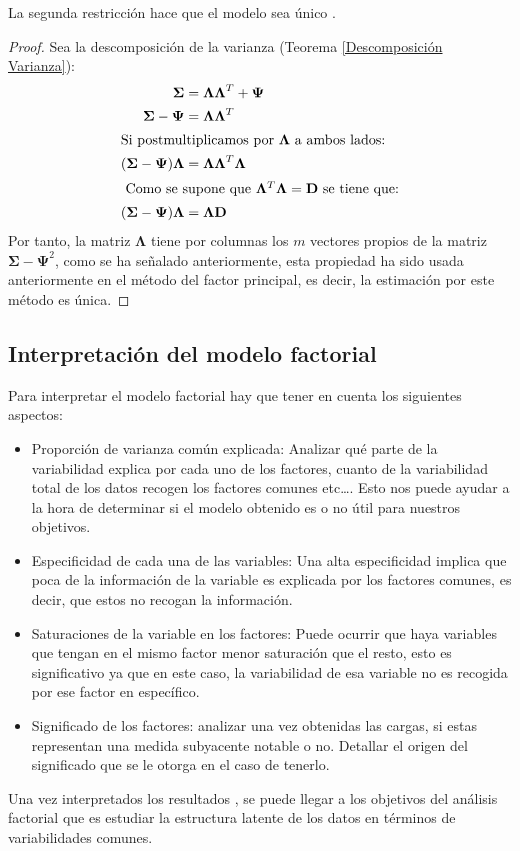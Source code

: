 \begin{propo}
La segunda restricción hace que el modelo sea único \cite{Peña 2002}. 
\begin{proof}
Sea la descomposición de la varianza (Teorema \ref{Descomposición Varianza}): \begin{align*}
\mathbf{\Sigma}&=\mathbf{\Lambda\Lambda}^T+\mathbf{\Psi}\\
\mathbf{\Sigma}-\mathbf{\Psi}&=\mathbf{\Lambda\Lambda}^T\\
\intertext{Si postmultiplicamos por $\mathbf{\Lambda}$ a ambos lados:}
(\mathbf{\Sigma}-\mathbf{\Psi})\mathbf{\Lambda}&=\mathbf{\Lambda\Lambda}^T \mathbf{\Lambda}\\
\intertext{ Como se supone que $\mathbf{\Lambda}^T \mathbf{\Lambda}=\mathbf{D}$ se tiene que:}
(\mathbf{\Sigma}-\mathbf{\Psi})\mathbf{\Lambda}&=\mathbf{\Lambda D}
\end{align*}
Por tanto, la matriz $\mathbf{\Lambda}$ tiene por columnas los $m$ vectores propios de la matriz $\mathbf{\Sigma-\Psi}^2$, como se ha señalado anteriormente, esta propiedad ha sido usada anteriormente en el método del factor principal, es decir, la estimación por este método es única. 
\end{proof}
\end{propo}
\subsection{Interpretación del modelo factorial}

\noindent Para interpretar el modelo factorial hay que tener en cuenta los siguientes aspectos:
\begin{itemize}
\item Proporción de varianza común explicada: Analizar qué parte de la variabilidad explica por cada uno de los factores, cuanto de la variabilidad total de los datos recogen los factores comunes etc\ldots. Esto nos puede ayudar a la hora de determinar si el modelo obtenido es o no útil para nuestros objetivos. 
\item Especificidad de cada una de las variables: Una alta especificidad implica que poca de la información de la variable es explicada por los factores comunes, es decir, que estos no recogan la información. 
\item Saturaciones de la variable en los factores: Puede ocurrir que haya variables que tengan en el mismo factor menor saturación que el resto, esto es significativo ya que en este caso, la variabilidad de esa variable no es recogida por ese factor en específico.

\item Significado de los factores:  analizar una vez obtenidas las cargas, si  estas representan una medida subyacente notable o no. Detallar el origen del significado que se le otorga en el caso de tenerlo.
\end{itemize}

\noindent Una vez interpretados los resultados , se puede llegar a los objetivos del análisis factorial que es estudiar la estructura latente de los datos en términos de variabilidades comunes. 

